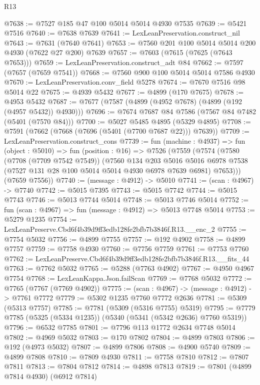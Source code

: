 \begin{lexlean}{R13}
\begin{coremodule}
@7638 := @7527 @185 @47 @100 @5014 @5014 @4930 @7535
@7639 := @5421 @7516
@7640 := @7638 @7639
@7641 := LexLeanPreservation.construct_nil
@7643 := @7631 (@7640 @7641)
@7653 := @7560 @201 @100 @5014 @5014 @200 @4930 (@7622 @27 @200) @7639
@7657 := @7603 (@7615 (@7625 (@7643 @7653)))
@7659 := LexLeanPreservation.construct_adt @84
@7662 := @7597 (@7657 (@7659 @7541))
@7668 := @7560 @900 @100 @5014 @5014 @7586 @4930
@7670 := LexLeanPreservation.conv_field @5278
@7674 := @7670 @7516 @98 @5014 @22
@7675 := @4939 @5432
@7677 := @4899 (@170 @7675)
@7678 := @4953 @5432
@7687 := @7677 (@7587 (@4899 (@4952 @7678) (@4899 (@192 (@4957 @5432)) @4930)))
@7696 := @7674 @7687 @84 @7586 (@7567 @84 @7482 (@5401 (@7570 @84)))
@7700 := @5027 @5485 @4895 (@5329 @4895)
@7708 := @7591 (@7662 (@7668 (@7696 (@5401 (@7700 @7687 @22))) @7639))
@7709 := LexLeanPreservation.construct_cons
@7739 := fun (machine : @4937) =>
  fun (object : @5010) =>
  fun (position : @16) =>
  @7526
    (@7559
      (@7574
        (@7580
          (@7708 (@7709 @7542 @7549))
          (@7560
            @134
            @203
            @5016
            @5016
            @6978
            @7538
            (@7527 @131 @28 @100 @5014 @5014 @4930 @6978 @7639 @6981)
            @7653)))
      (@7659 @7556))
@7740 := (message : @4912) -> @5010
@7741 := (scan : @4967) -> @7740
@7742 := @5015 @7395
@7743 := @5015 @7742
@7744 := @5015 @7743
@7746 := @5013 @7744 @5014
@7748 := @5013 @7746 @5014
@7752 := fun (scan : @4967) => fun (message : @4912) => @5013 @7748 @5014
@7753 := @5279 @1235
@7754 := LexLeanPreserve.Cbd6f4b39d9ff3edb128fe2bfb7b3846f.R13.__enc_2
@7755 := @7754 @5032
@7756 := @4899 @7755
@7757 := @192 @4902
@7758 := @4899 @7757
@7759 := @7758 @4930
@7760 := @7756 @7759
@7761 := @7753 @7760
@7762 := LexLeanPreserve.Cbd6f4b39d9ff3edb128fe2bfb7b3846f.R13.__fits_44
@7763 := @7762 @5032
@7765 := @5288 (@7763 @4902)
@7767 := @4950 @4967 @7754
@7768 := LexLeanKappa.Json.failScan
@7769 := @7768 @5032
@7772 := @7765 (@7767 (@7769 @4902))
@7775 := (scan : @4967) -> (message : @4912) -> @7761 @7772
@7779 := @5302 @1235 @7760 @7772 @2636
@7781 := @5309 (@5313 @7757)
@7785 := @7781 (@5309 (@5316 @7755) @5319)
@7795 := @7779 @7785 (@5325 (@5334 @1235)) (@5340 (@5341 (@5342 @2636) @7760 @5319))
@7796 := @6532 @7785
@7801 := @7796 @113 @1772 @2634 @7748 @5014
@7802 := @4969 @5032
@7803 := @170 @7802
@7804 := @4899 @7803
@7806 := @192 (@4973 @5032)
@7807 := @4899 @7806
@7808 := @4900 @5740
@7809 := @4899 @7808
@7810 := @7809 @4930
@7811 := @7758 @7810
@7812 := @7807 @7811
@7813 := @7804 @7812
@7814 := @4898 @7813
@7819 := @7801 (@4899 @7814 @4930) (@6912 @7814)

\end{coremodule}
\end{lexlean}
